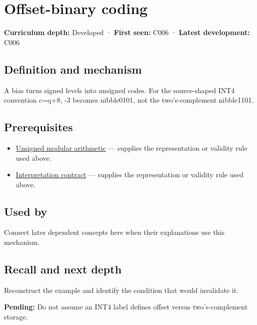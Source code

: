\hypertarget{appendix-53a8cfb25f8d}{}\label{referencestart:appendix-53a8cfb25f8d}
\section{Offset-binary coding}\label{appendix-53a8cfb25f8d-offset-binary-coding}

\textbf{Curriculum depth:} Developed · \textbf{First seen:} C006 · \textbf{Latest development:} C006

\subsection{Definition and mechanism}\label{appendix-53a8cfb25f8d-definition-and-mechanism}

A bias turns signed levels into unsigned codes. For the source-shaped INT4 convention c=q+8, -3 becomes nibble0101, not the two's-complement nibble1101.

\subsection{Prerequisites}\label{appendix-53a8cfb25f8d-prerequisites}

\begin{itemize}
\tightlist
\item
  \hyperref[appendix-c99977d88b33]{Unsigned modular arithmetic} --- supplies the representation or validity rule used above.
\item
  \hyperref[appendix-f414bd4ed05c]{Interpretation contract} --- supplies the representation or validity rule used above.
\end{itemize}

\subsection{Used by}\label{appendix-53a8cfb25f8d-used-by}

Connect later dependent concepts here when their explanations use this mechanism.

\subsection{Recall and next depth}\label{appendix-53a8cfb25f8d-recall-and-next-depth}

Reconstruct the example and identify the condition that would invalidate it.

\textbf{Pending:} Do not assume an INT4 label defines offset versus two's-complement storage.

